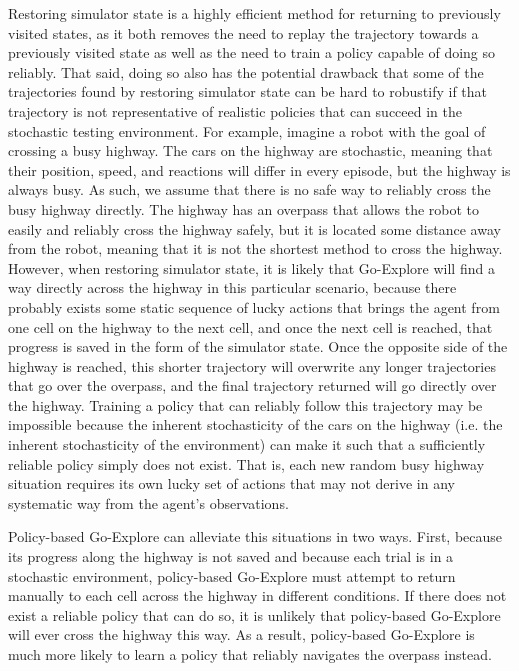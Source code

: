 \documentclass{nature}
\begin{document}
Restoring simulator state is a highly efficient method for returning to previously visited states, as it both removes the need to replay the trajectory towards a previously visited state as well as the need to train a policy capable of doing so reliably. 
That said, doing so also has the potential drawback that some of the trajectories found by restoring simulator state can be hard to robustify if that trajectory is not representative of realistic policies that can succeed in the stochastic testing environment.
For example, imagine a robot with the goal of crossing a busy highway.
The cars on the highway are stochastic, meaning that their position, speed, and reactions will differ in every episode, but the highway is always busy.
As such, we assume that there is no safe way to reliably cross the busy highway directly.
The highway has an overpass that allows the robot to easily and reliably cross the highway safely, but it is located some distance away from the robot, meaning that it is not the shortest method to cross the highway. 
However, when restoring simulator state, it is likely that Go-Explore will find a way directly across the highway in this particular scenario, because there probably exists some static sequence of lucky actions that brings the agent from one cell on the highway to the next cell, and once the next cell is reached, that progress is saved in the form of the simulator state. 
Once the opposite side of the highway is reached, this shorter trajectory will overwrite any longer trajectories that go over the overpass, and the final trajectory returned will go directly over the highway.
Training a policy that can reliably follow this trajectory may be impossible because the inherent stochasticity of the cars on the highway (i.e. the inherent stochasticity of the environment) can make it such that a sufficiently reliable policy simply does not exist. That is, each new random busy highway situation requires its own lucky set of actions that may not derive in any systematic way from the agent's observations.

Policy-based Go-Explore can alleviate this situations in two ways.
First, because its progress along the highway is not saved and because each trial is in a stochastic environment, policy-based Go-Explore must attempt to return manually to each cell across the highway in different conditions. 
If there does not exist a reliable policy that can do so, it is unlikely that policy-based Go-Explore will ever cross the highway this way.
As a result, policy-based Go-Explore is much more likely to learn a policy that reliably navigates the overpass instead.
\end{document}
